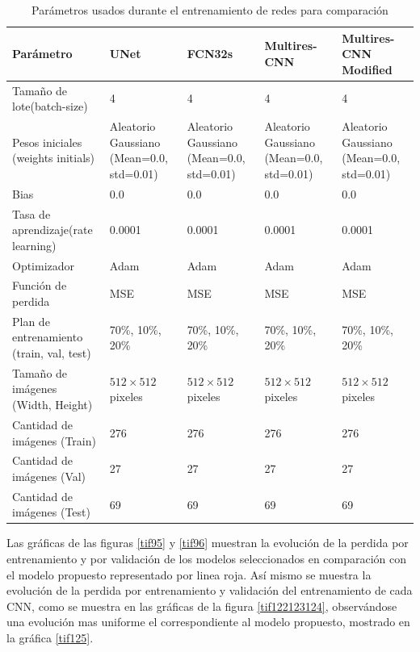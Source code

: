 \documentclass[10pt,letterpaper]{article}
\begin{document}
\begin{table}[H]
\begin{center}
\begin{tabular}{ p{1.8cm}  p{1.5cm}  p{1.5cm}  p{1.7cm}  p{2.3cm} }
\hline
Parámetro & UNet & FCN32s & Multires-CNN & Multires-CNN Modified\\	
\hline
Tamaño de lote(batch-size) & 4    & 4 & 4 & 4 \\
\hline
Pesos iniciales (weights initials) & Aleatorio Gaussiano (Mean=0.0, std=0.01)  & Aleatorio Gaussiano (Mean=0.0, std=0.01) & Aleatorio Gaussiano (Mean=0.0, std=0.01) & Aleatorio Gaussiano (Mean=0.0, std=0.01) \\
\hline
Bias                       & 0.0  & 0.0 & 0.0 & 0.0 \\
\hline
Tasa de aprendizaje(rate learning) & 0.0001  & 0.0001 & 0.0001 & 0.0001 \\
\hline
Optimizador                & Adam  & Adam & Adam & Adam \\
\hline
Función de perdida         & MSE & MSE & MSE & MSE \\
\hline
Plan de entrenamiento (train, val, test)& 70\%, 10\%, 20\%  & 70\%, 10\%, 20\% & 70\%, 10\%, 20\% & 70\%, 10\%, 20\% \\
\hline
Tamaño de imágenes (Width, Height)        & $512\times512$  pixeles & $512\times512$ pixeles & $512\times512$ pixeles & $512\times512$ pixeles \\
\hline
Cantidad de imágenes (Train) & 276  & 276 & 276 & 276 \\
\hline
Cantidad de imágenes (Val)   & 27  & 27 & 27 & 27 \\
\hline
Cantidad de imágenes (Test)  & 69  & 69 & 69 & 69 \\
\hline
\end{tabular}
\caption{Parámetros usados durante el entrenamiento de redes para comparación}
\label{Parametroscomparacion}
\end{center}
\end{table}


Las gráficas de las figuras \ref{tif95} y \ref{tif96} muestran la evolución de la perdida por entrenamiento y por validación de los modelos seleccionados en comparación con el modelo propuesto representado por linea roja. Así mismo se muestra la evolución de la perdida por entrenamiento y validación del entrenamiento de cada CNN, como se muestra en las gráficas de la figura \ref{tif122123124}, observándose una evolución mas uniforme el correspondiente al modelo propuesto, mostrado en la gráfica \ref{tif125}.
\end{document}
